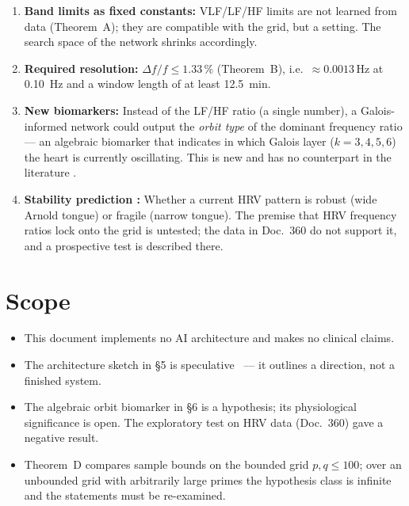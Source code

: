 \begin{enumerate}
\item \textbf{Band limits as fixed constants:} VLF/LF/HF limits
  are not learned from data (Theorem~A); they are compatible with the grid,
  but a setting. The search space of the network shrinks accordingly.
\item \textbf{Required resolution:} $\Delta f/f \le 1.33\,\%$
  (Theorem~B), i.e.\ $\approx0.0013$\,Hz at 0.10~Hz and a window length of
  at least 12.5~min.
\item \textbf{New biomarkers:} Instead of the LF/HF ratio (a single number),
  a Galois-informed network could output the \emph{orbit type} of the dominant
  frequency ratio --- an algebraic biomarker that
  indicates in which Galois layer ($k=3,4,5,6$) the heart is currently
  oscillating. This is new and has no counterpart in the literature \SM.
\item \textbf{Stability prediction \SM:} Whether a current HRV pattern
  is robust (wide Arnold tongue) or fragile (narrow tongue). The premise
  that HRV frequency ratios lock onto the grid is untested; the data in
  Doc.~360 do not support it, and a prospective test is described there.
\end{enumerate}

\section{Scope}

\begin{itemize}
\item This document implements no AI architecture and makes no
  clinical claims.
\item The architecture sketch in §5 is speculative \SM\ --- it outlines
  a direction, not a finished system.
\item The algebraic orbit biomarker in §6 is a hypothesis; its
  physiological significance is open. The exploratory test on HRV data
  (Doc.~360) gave a negative result.
\item Theorem~D compares sample bounds on the bounded grid
  $p,q\le100$; over an unbounded grid with arbitrarily large primes the
  hypothesis class is infinite and the statements must be re-examined.
\end{itemize}

